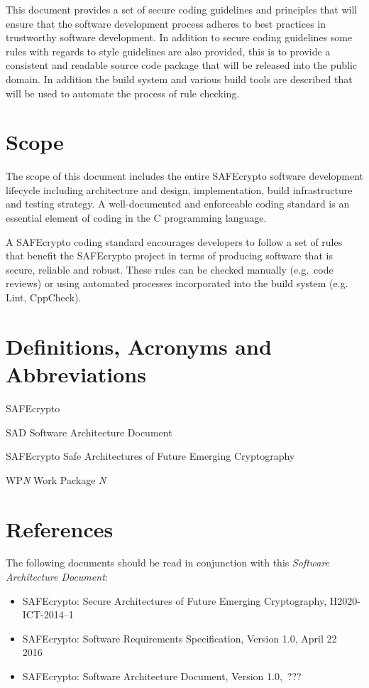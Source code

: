 This document provides a set of secure coding guidelines and principles that will ensure that the software development process adheres to best practices in trustworthy software development. In addition to secure coding guidelines some rules with regards to style guidelines are also provided, this is to provide a consistent and readable source code package that will be released into the public domain. In addition the build system and various build tools are described that will be used to automate the process of rule checking.

\section{Scope}
The scope of this document includes the entire SAFEcrypto software development lifecycle including architecture and design, implementation, build infrastructure and testing strategy. A well-documented and enforceable coding standard is an essential element of coding in the C programming language.

A SAFEcrypto coding standard encourages developers to follow a set of rules that benefit the SAFEcrypto project in terms of producing software that is secure, reliable and robust. These rules can be checked manually (e.g.\ code reviews) or using automated processes incorporated into the build system (e.g. Lint, CppCheck).


\section{Definitions, Acronyms and Abbreviations}
\begin{labeling}{SAFEcrypto}
\item [SAD] Software Architecture Document
\item [SAFEcrypto] Safe Architectures of Future Emerging Cryptography
\item [WP\textit{N}] Work Package \textit{N}
\end{labeling}

\section{References}
The following documents should be read in conjunction with this \textit{Software Architecture Document}:

\begin{itemize}
\item SAFEcrypto: Secure Architectures of Future Emerging Cryptography, H2020-ICT-2014--1~\cite{safecrypto_overview}
\item SAFEcrypto: Software Requirements Specification, Version 1.0, April 22 2016~\cite{safecrypto_srs}
\item SAFEcrypto: Software Architecture Document, Version 1.0,~???
\end{itemize}

